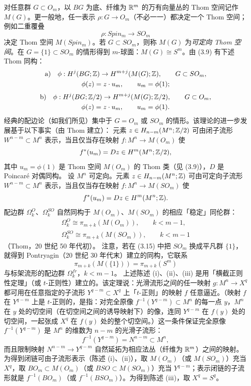 对任意群 $G\subset O_m$，以 $BG$ 为底、纤维为 $\mathbb{R}^m$ 的万有向量丛的 Thom 空间记作 $M(G)$。更一般地，任一表示 $\rho:G\to O_m$（不必一一）都决定一个 Thom 空间；例如二重覆叠
\[
  \rho:Spin_m\to SO_m
\]
决定 Thom 空间 $M(Spin_m)$。若 $G\subset SO_m$，则称 $M(G)$ 为\emph{可定向 Thom 空间}。在 $G=\{1\}\subset SO_m$ 的情形得到 $m$-球面：$M(G)\cong S^m$。由 (3.9) 有下述 Thom 同构：
\[
\begin{gathered}
  \text{a)}\quad \phi:H^j(BG;\mathbb{Z})\to H^{m+j}(M(G);\mathbb{Z}),\qquad G\subset SO_m,\\
  \phi(z)=z\cdot u_m,\qquad u_m=\phi(1);
\end{gathered}
\]
\[
\begin{gathered}
  \text{b)}\quad \phi:H^j(BG;\mathbb{Z}/2)\to H^{m+j}(M(G);\mathbb{Z}/2),\qquad G\subset O_m,\\
  \phi(z)=z\cdot u_m,\qquad u_m=\phi(1).
\end{gathered}
\]
经典的配边论（如我们所见）集中于 $G=O_m$ 或 $SO_m$ 的情形。该理论的进一步发展基于以下事实（由 Thom 建立）：
 元素 $z\in H_{n-m}(M^n;\mathbb{Z}/2)$ 可由闭子流形 $W^{n-m}\subset M^n$ 表示，当且仅当存在映射 $f:M^n\to M(O_m)$ 使
\[
  f^*(u_m)=Dz\in H^m(M^n;\mathbb{Z}/2),
\]
其中 $u_m=\phi(1)$ 是 Thom 空间 $M(O_m)$ 的 Thom 类（见 (3.9)），$D$ 是 Poincaré 对偶同构。
 设 $M^n$ 可定向。元素 $z\in H_{n-m}(M^n;\mathbb{Z})$ 可由可定向子流形 $W^{n-m}\subset M^n$ 表示，当且仅当存在映射 $f:M^n\to M(SO_m)$ 使
\[
  f^*(u_m)=Dz\in H^m(M^n;\mathbb{Z}).
\]
 配边群 $\Omega^O_k$、$\Omega^{SO}_k$ 自然同构于 $M(O_m)$、$M(SO_m)$ 的相应「稳定」同伦群：
\begin{equation}
\begin{gathered}
  \Omega^O_k\cong\pi_{m+k}(M(O_m)),\qquad k<m-1,\\
  \Omega^{SO}_k\cong\pi_{m+k}(M(SO_m)),\qquad k<m-1
\end{gathered}\tag{3.15}
\end{equation}
（Thom，20 世纪 50 年代初）。
注意，若在 (3.15) 中把 $SO_m$ 换成平凡群 $\{1\}$，就得到 Pontryagin（20 世纪 30 年代末）建立的同构，它联系
\[
  \pi_{m+k}(M(\{1\}))=\pi_{m+k}(S^m)
\]
与标架流形的配边群 $\Omega^{fr}_k$，$k<m-1$。
上述陈述 (i)、(ii)、(iii) 是用「横截正则性定理」（或 $t$-正则性）建立的。该定理说：光滑流形之间的任一映射 $g:M^n\to X^q$ 都可用在任意指定的子流形 $Y^{q-m}\subset X^q$ 上「$t$-正则」的映射 $f$ 任意逼近。（映射 $f$ 在 $Y^{q-m}$ 上是 $t$-正则的，是指：对完全原像 $f^{-1}(Y^{q-m})\subset M^n$ 的每一点 $y$，$M^n$ 在 $y$ 处的切空间（在切空间之间的诱导映射下）的像，连同 $Y^{q-m}$ 在 $f(y)$ 处的切空间，一起张成 $X^q$ 在 $f(y)$ 处的整个切空间。）这一条件保证完全原像 $f^{-1}(Y^{q-m})$ 是 $M^n$ 的维数为 $n-m$ 的光滑子流形：
\[
  f^{-1}(Y^{q-m})=N^{n-m}\subset M^n,
\]
而且限制映射 $N^{n-m}\to Y^{q-m}$ 自然延拓为相应法丛（纤维为 $\mathbb{R}^m$）之间的映射。
为得到闭链可由子流形表示（陈述 (i)、(ii)），取 $M(O_m)$（或 $M(SO_m)$）充当 $X^q$，取 $BO_m\subset M(O_m)$（或 $BSO\subset M(SO_m)$）充当 $Y^{q-m}$；表示闭链的子流形就是 $f^{-1}(BO_m)$（或 $f^{-1}(BSO_m)$）。为得到陈述 (iii)，取 $X^q=S^q$。

